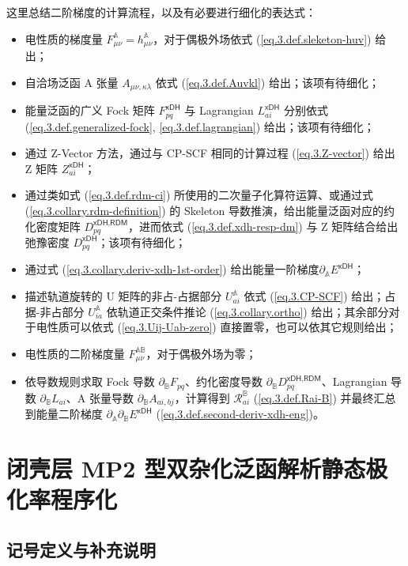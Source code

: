 这里总结二阶梯度的计算流程，以及有必要进行细化的表达式：
\begin{itemize}[nosep]
  \item 电性质的梯度量 $F_{\mu \nu}^{\mathbb{A}} = h_{\mu \nu}^{\mathbb{A}}$，对于偶极外场依式 (\ref{eq.3.def.sleketon-huv}) 给出；
  \item 自洽场泛函 A 张量 $A_{\mu \nu, \kappa \lambda}$ 依式 (\ref{eq.3.def.Auvkl}) 给出；该项有待细化；
  \item 能量泛函的广义 Fock 矩阵 $F_{pq}^\textsf{xDH}$ 与 Lagrangian $L_{ai}^\textsf{xDH}$ 分别依式 (\ref{eq.3.def.generalized-fock}, \ref{eq.3.def.lagrangian}) 给出；该项有待细化；
  \item 通过 Z-Vector 方法，通过与 CP-SCF 相同的计算过程 (\ref{eq.3.Z-vector}) 给出 Z 矩阵 $Z_{ai}^\textsf{xDH}$；
  \item 通过类如式 (\ref{eq.3.def.rdm-ci}) 所使用的二次量子化算符运算、或通过式 (\ref{eq.3.collary.rdm-definition}) 的 Skeleton 导数推演，给出能量泛函对应的约化密度矩阵 $D_{pq}^{\textsf{xDH}, \textsf{RDM}}$，进而依式 (\ref{eq.3.def.xdh-resp-dm}) 与 Z 矩阵结合给出弛豫密度 $D_{pq}^\textsf{xDH}$；该项有待细化；
  \item 通过式 (\ref{eq.3.collary.deriv-xdh-1st-order}) 给出能量一阶梯度$\partial_{\mathbb{A}} E^\textsf{xDH}$；
  \item 描述轨道旋转的 U 矩阵的非占-占据部分 $U_{ai}^{\mathbb{A}}$ 依式 (\ref{eq.3.CP-SCF}) 给出；占据-非占部分 $U_{ia}^{\mathbb{A}}$ 依轨道正交条件推论 (\ref{eq.3.collary.ortho}) 给出；其余部分对于电性质可以依式 (\ref{eq.3.Uij-Uab-zero}) 直接置零，也可以依其它规则给出；
  \item 电性质的二阶梯度量 $F_{\mu \nu}^{\mathbb{AB}}$，对于偶极外场为零；
  \item 依导数规则求取 Fock 导数 $\partial_{\mathbb{B}} F_{pq}$、约化密度导数 $\partial_{\mathbb{B}} D_{pq}^{\textsf{xDH}, \textsf{RDM}}$、Lagrangian 导数 $\partial_{\mathbb{B}} L_{ai}$、A 张量导数 $\partial_{\mathbb{B}} A_{ai, bj}$，计算得到 $\mathscr{R}_{ai}^{\mathbb{B}}$ (\ref{eq.3.def.Rai-B}) 并最终汇总到能量二阶梯度 $\partial_{\mathbb{A}} \partial_{\mathbb{B}} E^\textsf{xDH}$ (\ref{eq.3.def.second-deriv-xdh-eng})。
\end{itemize}

\section{闭壳层 MP2 型双杂化泛函解析静态极化率程序化}
\label{sec.3.3.program}

\subsection{记号定义与补充说明}

